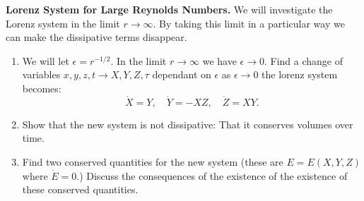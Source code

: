 \documentclass{article}
\begin{document}
\begin{question} \textbf{Lorenz System for Large Reynolds Numbers.} We will investigate the Lorenz system in the limit $r\to \infty$. By taking this limit in a particular way we can make the dissipative terms disappear.

\begin{enumerate}[label=(\alph*)]
  \item We will let $\epsilon = r^{-1/2}$. In the limit $r\to \infty$ we have $\epsilon \to 0$. Find a change of variables $x,y,z,t\to X,Y,Z,\tau$ dependant on $\epsilon$ as $\epsilon \to 0$ the lorenz system becomes:
  \begin{equation}
    \dot X = Y, \quad \dot Y = - XZ, \quad \dot Z= XY.
  \end{equation}
  \item Show that the new system is not dissipative: That it conserves volumes over time.
  \item Find two conserved quantities for the new system (these are $E=E(X,Y,Z)$ where $\dot E=0$.) Discuss the consequences of the existence of the existence of these conserved quantities.
\end{enumerate}
\end{question} 
\end{document}
